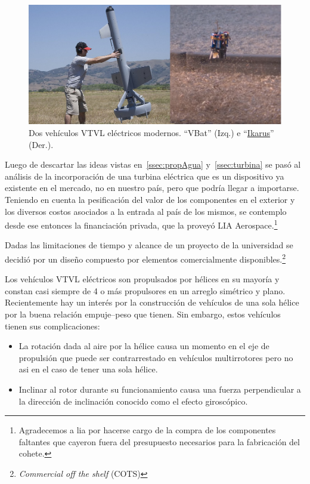 \begin{figure}[htb]
    \centering
    \includegraphics[width=0.8\linewidth]{fig/vbat_icarus.png}
    \caption{Dos vehículos VTVL eléctricos modernos. ``VBat'' (Izq.) e ``\href{https://hackaday.com/2018/08/31/single-rotor-drone-a-thrust-vectoring-monocopter/}{Ikarus}'' (Der.).}
    \label{fig:vbat_icarus}
\end{figure}

Luego de descartar las ideas vistas en~\ref{ssec:propAgua} y~\ref{ssec:turbina} se pasó al análisis de la incorporación de una turbina eléctrica que es un dispositivo ya existente en el mercado, no en nuestro país, pero que podría llegar a importarse. Teniendo en cuenta la pesificación del valor de los componentes en el exterior y los diversos costos asociados a la entrada al país de los mismos, se contemplo desde ese entonces la financiación privada, que la proveyó LIA Aerospace.\footnote{Agradecemos a \gls{lia} por hacerse cargo de la compra de los componentes faltantes que cayeron fuera del presupuesto necesarios para la fabricación del cohete.} 

Dadas las limitaciones de tiempo y alcance de un proyecto de la universidad se decidió por un diseño compuesto por elementos comercialmente disponibles.\footnote{\textit{Commercial off the shelf} (COTS)}

\medskip

Los vehículos VTVL eléctricos son propulsados por hélices en su mayoría y constan casi siempre de 4 o más propulsores en un arreglo simétrico y plano. Recientemente hay un interés por la construcción de vehículos de una sola hélice por la buena relación empuje--peso que tienen. Sin embargo, estos vehículos tienen sus complicaciones: 

\begin{itemize}
    \item La rotación dada al aire por la hélice causa un momento en el eje de propulsión que puede ser contrarrestado en vehículos multirrotores pero no asi en el caso de tener una sola hélice.
    \item Inclinar al rotor durante su funcionamiento causa una fuerza perpendicular a la dirección de inclinación conocido como el efecto giroscópico. 
\end{itemize}

